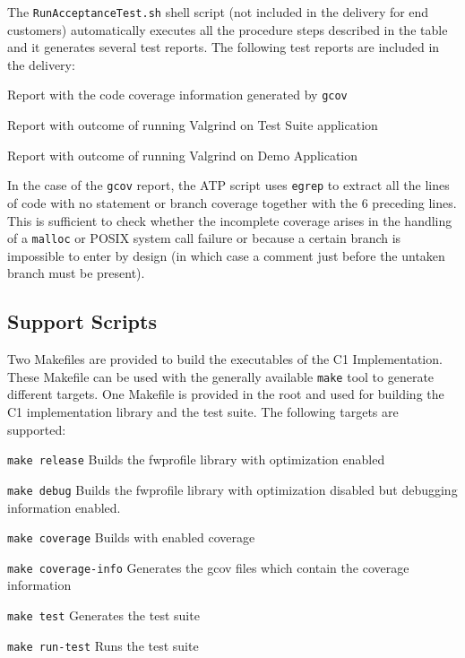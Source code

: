 \documentclass[a4paper,10pt]{article}
\newenvironment{fw_itemize}						%
{\begin{itemize}
  \setlength{\itemsep}{1mm}
  \setlength{\parskip}{0pt}
  \setlength{\parsep}{0pt}}
{\end{itemize}}
\begin{document}
The \texttt{RunAcceptanceTest.sh} shell script (not included in the delivery for end customers) automatically executes all the procedure steps described in the table and it generates several test reports. The following test reports are included in the delivery:

\begin{fw_itemize}
\item Report with the code coverage information generated by \texttt{gcov}
\item Report with outcome of running Valgrind on Test Suite application
\item Report with outcome of running Valgrind on Demo Application
\end{fw_itemize}

In the case of the \texttt{gcov} report, the ATP script uses \texttt{egrep} to extract all the lines of code with no statement or branch coverage together with the 6 preceding lines. This is sufficient to check whether the incomplete coverage arises in the handling of a \texttt{malloc} or POSIX system call failure or because a certain branch is impossible to enter by design (in which case a comment just before the untaken branch must be present).

\subsection{Support Scripts}\label{ref:script}
Two Makefiles are provided to build the executables of the C1 Implementation. These Makefile can be used with the generally available \texttt{make} tool to generate different targets.
One Makefile is provided in the root and used for building the C1 implementation library and the test suite. The following targets are supported:
\begin{fw_itemize}
\item \texttt{make release} Builds the fwprofile library with optimization enabled
\item \texttt{make debug} Builds the fwprofile library with optimization disabled but debugging information enabled.
\item \texttt{make coverage} Builds with enabled coverage 
\item \texttt{make coverage-info} Generates the gcov files which contain the coverage information
\item \texttt{make test} Generates the test suite
\item \texttt{make run-test} Runs the test suite
\end{fw_itemize}
\end{document}
